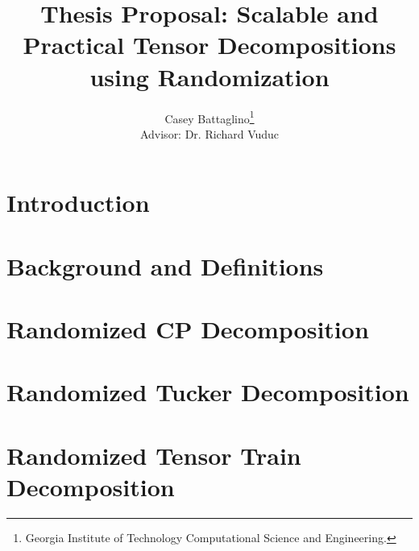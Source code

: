 \documentclass[12pt]{report}
\begin{document}
\title{Thesis Proposal: Scalable and Practical Tensor Decompositions using Randomization}
\author {
	Casey Battaglino\thanks{Georgia Institute of Technology Computational Science and Engineering.}
	\\ Advisor: Dr. Richard Vuduc
}
\maketitle
\tableofcontents
% 

\section{Introduction}\label{sec:introduction}


\section{Background and Definitions} \label{sec:background} 



\section{Randomized CP Decomposition} \label{sec:cp} 


\section{Randomized Tucker Decomposition} \label{sec:tucker} 


\section{Randomized Tensor Train Decomposition} \label{sec:tt} 


% 
%



\end{document}
